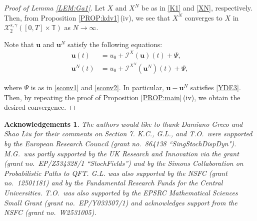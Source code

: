 \documentclass[letterpaper, 11pt,  reqno]{amsart}
\newcommand{\1}{\hspace{0.5mm}\text{I}\hspace{0.5mm}}
\newcommand{\I}{\mathcal{I}}
\newcommand{\noi}{\noindent}
\newcommand{\T}{\mathbb{T}}
\newcommand{\g}{\gamma}
\newcommand{\cX}{\mathcal{X}}
\newcommand{\uu}{\mathbf{u}}
\newtheorem*{ackno}{Acknowledgements}
\numberwithin{equation}{section}
\numberwithin{theorem}{section}
\begin{document}
 
\begin{proof}[Proof of Lemma \ref{LEM:Ga1}]

Let $X$ and $X^N$ be as in 
\eqref{K1} and 
\eqref{XN},   respectively.
Then, 
from Proposition \ref{PROP:kdv1}\,(iv), 
we see that 
$X^N$ converges to  $X$ 
in  $ \cX^{s, \g}_2([0, T]\times \T)$ as $N \to \infty$.

Note that $\uu$ and $\uu^N$ satisfy the following equations:
\begin{align*}
\uu(t) & = u_0 + \I^{X}(\uu)(t) + \Psi, \\
\uu^N(t) & = u_0 + \I^{X^N}(\uu^N)(t) + \Psi, 
\end{align*}

\noi
where $\Psi$ is as in \eqref{sconv1} and \eqref{sconv2}.
In particular, $\uu - \uu^N$ satisfies \eqref{YDE3}.
Then, by repeating the proof of 
Proposition \ref{PROP:main}\,(iv), 
we obtain the desired convergence.
\end{proof}
	









\begin{ackno}\rm
The authors would like to thank Damiano Greco and Shao Liu
for their comments on Section 7.
K.C., G.L., and T.O.~were supported by the European Research Council (grant no.~864138 ``SingStochDispDyn").
M.G.~was partly supported by the UK Research and Innovation via the grant 
(grant no.~EP/Z534328/1 ``StochFields'')  and by the Simons Collaboration on Probabilistic Paths to QFT.
G.L. was also supported by the NSFC (grant no.~12501181)
and   by the Fundamental Research Funds for the Central Universities. 
T.O.~was also supported by the EPSRC 
Mathematical Sciences
Small Grant  (grant no.~EP/Y033507/1)
and acknowledges support from  
the NSFC (grant no.~W2531005).


\end{ackno}
\end{document}
